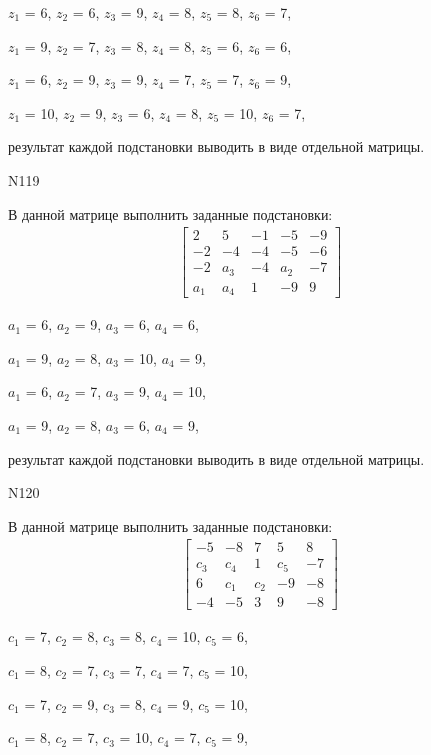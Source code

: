 \documentclass[11pt]{report}
\begin{document}
$z_{1}$ = 6, $z_{2}$ = 6, $z_{3}$ = 9, $z_{4}$ = 8, $z_{5}$ = 8, $z_{6}$ = 7, 

$z_{1}$ = 9, $z_{2}$ = 7, $z_{3}$ = 8, $z_{4}$ = 8, $z_{5}$ = 6, $z_{6}$ = 6, 

$z_{1}$ = 6, $z_{2}$ = 9, $z_{3}$ = 9, $z_{4}$ = 7, $z_{5}$ = 7, $z_{6}$ = 9, 

$z_{1}$ = 10, $z_{2}$ = 9, $z_{3}$ = 6, $z_{4}$ = 8, $z_{5}$ = 10, $z_{6}$ = 7, 

результат каждой подстановки выводить в виде отдельной матрицы.

N119

В данной матрице выполнить заданные подстановки:
\begin{align*}
\left[\begin{matrix}2 & 5 & -1 & -5 & -9\\-2 & -4 & -4 & -5 & -6\\-2 & a_{3} & -4 & a_{2} & -7\\a_{1} & a_{4} & 1 & -9 & 9\end{matrix}\right]
\end{align*}


$a_{1}$ = 6, $a_{2}$ = 9, $a_{3}$ = 6, $a_{4}$ = 6, 

$a_{1}$ = 9, $a_{2}$ = 8, $a_{3}$ = 10, $a_{4}$ = 9, 

$a_{1}$ = 6, $a_{2}$ = 7, $a_{3}$ = 9, $a_{4}$ = 10, 

$a_{1}$ = 9, $a_{2}$ = 8, $a_{3}$ = 6, $a_{4}$ = 9, 

результат каждой подстановки выводить в виде отдельной матрицы.

N120

В данной матрице выполнить заданные подстановки:
\begin{align*}
\left[\begin{matrix}-5 & -8 & 7 & 5 & 8\\c_{3} & c_{4} & 1 & c_{5} & -7\\6 & c_{1} & c_{2} & -9 & -8\\-4 & -5 & 3 & 9 & -8\end{matrix}\right]
\end{align*}


$c_{1}$ = 7, $c_{2}$ = 8, $c_{3}$ = 8, $c_{4}$ = 10, $c_{5}$ = 6, 

$c_{1}$ = 8, $c_{2}$ = 7, $c_{3}$ = 7, $c_{4}$ = 7, $c_{5}$ = 10, 

$c_{1}$ = 7, $c_{2}$ = 9, $c_{3}$ = 8, $c_{4}$ = 9, $c_{5}$ = 10, 

$c_{1}$ = 8, $c_{2}$ = 7, $c_{3}$ = 10, $c_{4}$ = 7, $c_{5}$ = 9, 
\end{document}
